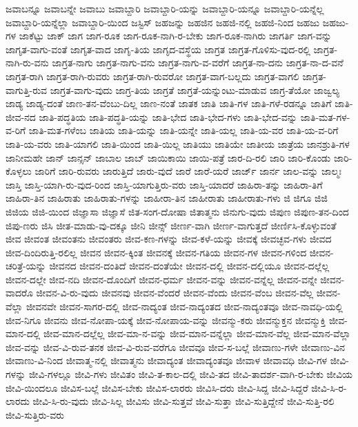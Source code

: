 {ಜವಾಬನ್ನೂ
ಜವಾಬನ್ನೇ
ಜವಾಬು
ಜವಾಬ್ದಾರಿ
ಜವಾಬ್ದಾರಿ-ಯನ್ನು
ಜವಾಬ್ದಾರಿ-ಯನ್ನೂ
ಜವಾಬ್ದಾರಿ-ಯನ್ನೆಲ್ಲ
ಜವಾಬ್ದಾರಿ-ಯನ್ನೆಲ್ಲಾ
ಜವಾಬ್ದಾರಿ-ಯಿಂದ
ಜಸ್ಟಿಸ್
ಜಹಜನ್ನು
ಜಹಜಿನ
ಜಹಜಿ-ನಲ್ಲಿ
ಜಹಜಿ-ನಿಂದ
ಜಹಜು
ಜಹಜು-ಗಳ
ಜಾಕೆಟ್ಟು
ಜಾಕ್
ಜಾಗ
ಜಾಗ-ರೂಕ
ಜಾಗ-ರೂಕ-ನಾಗಿ-ರ-ಬೇಕು
ಜಾಗ-ರೂಕ-ನಾಗಿರು
ಜಾಗರ್ತಿ
ಜಾಗ-ವನ್ನು
ಜಾಗೃತ-ವಾಗು-ವಂತೆ
ಜಾಗೃತ-ವಾದ
ಜಾಗೃ-ತಿಯ
ಜಾಗೃದ-ವಸ್ಥೆಯ
ಜಾಗ್ರತ
ಜಾಗ್ರತ-ಗೊಳಿಸು-ವುದ-ರಲ್ಲಿ
ಜಾಗ್ರತ-ನಾಗಿ-ರು-ವನು
ಜಾಗ್ರತ-ನಾಗು
ಜಾಗ್ರತ-ನಾಗು-ವನು
ಜಾಗ್ರತ-ನಾಗು-ವ-ವರೆಗೆ
ಜಾಗ್ರತ-ನಾ-ದನು
ಜಾಗ್ರತ-ನಾ-ದ-ವನೆ
ಜಾಗ್ರತ-ರಾಗಿ
ಜಾಗ್ರತ-ರಾಗಿ-ರುವರು
ಜಾಗ್ರತ-ರಾಗಿ-ರುವರೋ
ಜಾಗ್ರತ-ವಾಗ-ಬಲ್ಲದು
ಜಾಗ್ರತ-ವಾಗಲಿ
ಜಾಗ್ರತ-ವಾಗುತ್ತಿ-ರುವ
ಜಾಗ್ರತ-ವಾಗು-ವುದು
ಜಾಗ್ರ-ತಿಯ
ಜಾಗ್ರತೆ
ಜಾಗ್ರತೆ-ಯನ್ನುಂಟು-ಮಾಡುವ
ಜಾಗ್ರ-ತೆಯೋ
ಜಾಜ್ವಲ್ಯ
ಜಾಡ್ಯ
ಜಾಡ್ಯ-ದಂತೆ
ಜಾಣ-ತನ-ವೆಂಬು-ದಿಲ್ಲ
ಜಾಣ-ನಂತೆ
ಜಾತಕ
ಜಾತಿ
ಜಾತಿ-ಗಳ
ಜಾತಿ-ಗಳೆ-ರಡನ್ನೂ
ಜಾತಿಗೆ
ಜಾತಿ-ಜೀವ-ನದ
ಜಾತಿ-ಪದ್ಧತಿಯ
ಜಾತಿ-ಪದ್ಧತಿ-ಯನ್ನು
ಜಾತಿ-ಭೇದ
ಜಾತಿ-ಭೇದ-ಗಳು
ಜಾತಿ-ಭೇದ-ವನ್ನು
ಜಾತಿ-ಮತ-ಗಳ-ವ-ರಿಗೆ
ಜಾತಿ-ಮತ-ಗಳೆಂಬ
ಜಾತಿಯ
ಜಾತಿ-ಯನ್ನು
ಜಾತಿ-ಯನ್ನೇ
ಜಾತಿ-ಯಲ್ಲ
ಜಾತಿ-ಯ-ವರ
ಜಾತಿ-ಯ-ವ-ರಿಗೆ
ಜಾತಿ-ಯ-ವರು
ಜಾತಿ-ಯಾಗಲಿ
ಜಾತಿ-ಯಿಂದ
ಜಾತಿ-ಯಿಲ್ಲ
ಜಾತಿಯು
ಜಾತಿಯೇ
ಜಾತೀಯ
ಜಾತ್ರೆಯ
ಜಾನಶ್ರುತಿ-ಗಳ
ಜಾನೀಮಹೇ
ಜಾನ್
ಜಾನ್ಸನ್
ಜಾಬಾಲ
ಜಾಬ್
ಜಾಯಿಕಾಯಿ
ಜಾಯಿ-ಪತ್ರೆ
ಜಾರ-ದಿ-ರಲಿ
ಜಾರಿ
ಜಾರಿ-ಕೊಂಡು
ಜಾರಿ-ಕೊಳ್ಳಲು
ಜಾರಿಗೆ
ಜಾರಿ-ರುವರು
ಜಾರುತ್ತಿದೆ
ಜಾರು-ವುದೆ
ಜಾರೆ
ಜಾರೆ-ಯರೆ
ಜಾರ್ಜ್
ಜಾರ್ನ
ಜಾಲ-ವನ್ನು
ಜಾಲ್ಮಃ
ಜಾಸ್ತಿ
ಜಾಸ್ತಿ-ಯಾಗಿ-ರು-ವುದ-ರಿಂದ
ಜಾಸ್ತಿ-ಯಾಗುತ್ತಿರು-ವರು
ಜಾಸ್ತಿ-ಯಾದರೆ
ಜಾಹಿರಾ-ತನ್ನು
ಜಾಹಿರಾ-ತಿಗೆ
ಜಾಹಿರಾ-ತಿನ
ಜಾಹಿರಾತು
ಜಾಹಿರಾತು-ಗಳನ್ನು
ಜಾಹೀರಾ-ತಿನ
ಜಾಹೀರಾತು
ಜಾಹೀರಾತು-ಗಳು
ಜಿ
ಜಿಗೂ
ಜಿಜಿ
ಜಿಜಿಯ
ಜಿಜಿ-ಯಿಂದ
ಜಿಜ್ಞಾಸಾ
ಜಿಜ್ಞಾಸೆ
ಜಿತ-ಸಂಗ-ದೋಷಾ
ಜಿತಾತ್ಮನು
ಜಿನುಗು-ವುದು
ಜಿಪುಣ
ಜಿಪುಣ-ತನ-ದಿಂದ
ಜಿಪು-ಣರು
ಜಿಸಿ
ಜೀತ-ಮಾಡು-ವು-ದಕ್ಕೂ
ಜೀನಿ
ಜೀನ್ಸ್
ಜೀರ್ಣ-ವಾಗಿ
ಜೀರ್ಣ-ವಾಗುತ್ತದೆ
ಜೀರ್ಣಿಸಿ-ಕೊಳ್ಳುವಂತೆ
ಜೀವ
ಜೀವಂತ
ಜೀವಂತನು
ಜೀವಂತರು
ಜೀವ-ಕಣ-ಗಳನ್ನು
ಜೀವ-ಕಳೆ-ಯನ್ನು
ಜೀವಕ್ಕೆ
ಜೀವಚ್ಛವ-ಗಳು
ಜೀವದ
ಜೀವ-ದಿಂದಿರುತ್ತಿ-ರಲಿಲ್ಲ
ಜೀವನ
ಜೀವನ-ಕ್ಕಿಂತ
ಜೀವನಕ್ಕೆ
ಜೀವನ-ಗತಿಯ
ಜೀವನ-ಗಳ
ಜೀವನ-ಗಳಿಂದ
ಜೀವನ-ಚರಿತ್ರೆ-ಯನ್ನು
ಜೀವನದ
ಜೀವನ-ದಂತಿದೆ
ಜೀವನ-ದಂತೆಯೇ
ಜೀವನ-ದಲ್ಲಿ
ಜೀವನ-ದಲ್ಲಿಯೂ
ಜೀವನ-ದಲ್ಲೆಲ್ಲ
ಜೀವನ-ದಲ್ಲೇ
ಜೀವ-ನದಿ
ಜೀವನ-ದೊಂದಿಗೆ
ಜೀವನ-ಧರ್ಮ
ಜೀವನ-ವನ್ನು
ಜೀವನ-ವನ್ನೆಲ್ಲ
ಜೀವನ-ವನ್ನೇ
ಜೀವನ-ವಾದರೊ
ಜೀವನ-ವಿ-ರು-ವುದು
ಜೀವನವು
ಜೀವನ-ವೆಂದರೆ
ಜೀವನ-ವೆಂದು
ಜೀವನ-ವೆಂಬ
ಜೀವನ-ವೆಲ್ಲ
ಜೀವನ-ವೆಲ್ಲಾ
ಜೀವನವೇ
ಜೀವನ-ಸಾಗರ-ದಲ್ಲಿ
ಜೀವ-ನಾದ್ಯಂತ
ಜೀವ-ನಾದ್ಯಂತದ
ಜೀವ-ನಾದ್ಯಂತವೂ
ಜೀವ-ನಾವಧಿ-ಯಲ್ಲಿ
ಜೀವ-ನಿಗೂ
ಜೀವನು
ಜೀವ-ನೋಪಾ-ಯಕ್ಕೆ
ಜೀವ-ನೋಪಾಯ-ವನ್ನು
ಜೀವನ್ಮು-ಕರು
ಜೀವನ್ಮುಕ್ತನ
ಜೀವನ್ಮುಕ್ತಿ
ಜೀವ-ಮಾನ-ದಲ್ಲಿ
ಜೀವ-ಮಾನ-ದಲ್ಲೆಲ್ಲ
ಜೀವ-ಮಾ-ನ-ವನ್ನು
ಜೀವ-ಮಾನ-ವನ್ನೆಲ್ಲಾ
ಜೀವ-ಮಾನ-ವೆಲ್ಲ
ಜೀವ-ಮಾನ-ವೆಲ್ಲಾ
ಜೀವ-ವನ್ನು
ಜೀವ-ವಿ-ರುವ-ತನಕ
ಜೀವ-ವಿ-ರುವ-ವರೆಗೂ
ಜೀವವೂ
ಜೀವ-ಸ-ಬಲ್ಲೆ
ಜೀವಾಣು-ಗಳೇ
ಜೀವಾಣು-ವಿನ
ಜೀವಾಣು-ವಿ-ನಿಂದ
ಜೀವಾತ್ಮ-ನಲ್ಲಿ
ಜೀವಾತ್ಮನು
ಜೀವಾದ್ಯಂತ
ಜೀವಾದ್ಯಂತವೂ
ಜೀವಾಳ
ಜೀವಾವಧಿ
ಜೀವಿ-ಗಳ
ಜೀವಿ-ಗಳನ್ನು
ಜೀವಿ-ಗಳಲ್ಲೂ
ಜೀವಿ-ಗಳು
ಜೀವಿತಂ
ಜೀವಿ-ತ-ಕಾಲ-ದಲ್ಲಿ
ಜೀವಿ-ತದ
ಜೀವಿ-ತಾದರ್ಶ-ವಾಗಿ-ರ-ಬೇಕು
ಜೀವಿಯ
ಜೀವಿ-ಯಿಂದಲೂ
ಜೀವಿಸ-ಬಲ್ಲೆ
ಜೀವಿಸ-ಬೇಕು
ಜೀವಿಸ-ಲಾರರು
ಜೀವಿಸಿ-ದರು
ಜೀವಿ-ಸಿದ್ದ
ಜೀವಿ-ಸಿದ್ದರೆ
ಜೀವಿ-ಸಿ-ರ-ಲಾರದು
ಜೀವಿ-ಸಿ-ರು-ವುದು
ಜೀವಿ-ಸಿಲ್ಲ
ಜೀವಿಸು
ಜೀವಿ-ಸುತ್ತವೆ
ಜೀವಿ-ಸುತ್ತಾ
ಜೀವಿ-ಸುತ್ತಿದ್ದೇನೆ
ಜೀವಿ-ಸುತ್ತಿ-ರಲಿ
ಜೀವಿ-ಸುತ್ತಿರು-ವರು
}
